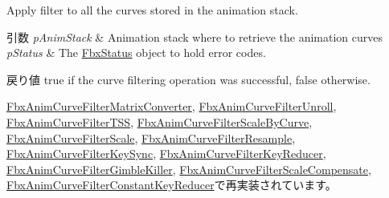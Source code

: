 Apply filter to all the curves stored in the animation stack. 
\begin{DoxyParams}{引数}
{\em p\+Anim\+Stack} & Animation stack where to retrieve the animation curves \\
\hline
{\em p\+Status} & The \hyperlink{class_fbx_status}{Fbx\+Status} object to hold error codes. \\
\hline
\end{DoxyParams}
\begin{DoxyReturn}{戻り値}
{\ttfamily true} if the curve filtering operation was successful, {\ttfamily false} otherwise. 
\end{DoxyReturn}


\hyperlink{class_fbx_anim_curve_filter_matrix_converter_a20db5fcf27096c750a9b5bfc1ed074e4}{Fbx\+Anim\+Curve\+Filter\+Matrix\+Converter}, \hyperlink{class_fbx_anim_curve_filter_unroll_ae9b4807d576e93ae4800c1764f2aabda}{Fbx\+Anim\+Curve\+Filter\+Unroll}, \hyperlink{class_fbx_anim_curve_filter_t_s_s_a7c301b85f939c3614d998f18e7a20f21}{Fbx\+Anim\+Curve\+Filter\+T\+SS}, \hyperlink{class_fbx_anim_curve_filter_scale_by_curve_a6a1c172a82c4e5e2263d388c74ec9dba}{Fbx\+Anim\+Curve\+Filter\+Scale\+By\+Curve}, \hyperlink{class_fbx_anim_curve_filter_scale_ac6fb7610299bd0fc1e399418f8d17b90}{Fbx\+Anim\+Curve\+Filter\+Scale}, \hyperlink{class_fbx_anim_curve_filter_resample_a0f94e6a08f94ee1798b3bdce67285f53}{Fbx\+Anim\+Curve\+Filter\+Resample}, \hyperlink{class_fbx_anim_curve_filter_key_sync_a4eb3dd7372f7747bcae1be8722db75e0}{Fbx\+Anim\+Curve\+Filter\+Key\+Sync}, \hyperlink{class_fbx_anim_curve_filter_key_reducer_ace307ff2d9d99bf845ddaa26649fb136}{Fbx\+Anim\+Curve\+Filter\+Key\+Reducer}, \hyperlink{class_fbx_anim_curve_filter_gimble_killer_acee7b2b1c995cc079152b5ff8c96bfff}{Fbx\+Anim\+Curve\+Filter\+Gimble\+Killer}, \hyperlink{class_fbx_anim_curve_filter_scale_compensate_a79f0dd5ea9c83ab4fe1088c63c572133}{Fbx\+Anim\+Curve\+Filter\+Scale\+Compensate}, \hyperlink{class_fbx_anim_curve_filter_constant_key_reducer_a723169c1dc3a2d9557eb03908055c277}{Fbx\+Anim\+Curve\+Filter\+Constant\+Key\+Reducer}で再実装されています。

\mbox{\label{class_fbx_anim_curve_filter_a009498a65af4995bf5e5908f17837531}} 
